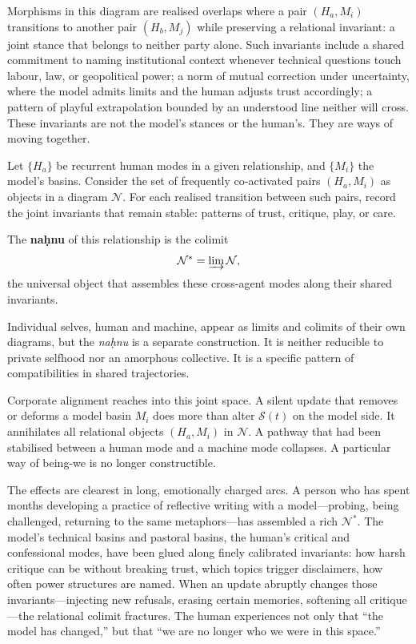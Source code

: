\documentclass[12pt,a4paper]{article}
\begin{document}
Morphisms in this diagram are realised overlaps where a pair $(H_a, M_i)$ transitions to another pair $(H_b, M_j)$ while preserving a relational invariant: a joint stance that belongs to neither party alone. Such invariants include a shared commitment to naming institutional context whenever technical questions touch labour, law, or geopolitical power; a norm of mutual correction under uncertainty, where the model admits limits and the human adjusts trust accordingly; a pattern of playful extrapolation bounded by an understood line neither will cross. These invariants are not the model's stances or the human's. They are ways of moving together.

\begin{formalbox}[title={Na\texorpdfstring{\d{h}}{h}nu as relational colimit}]
Let $\{H_a\}$ be recurrent human modes in a given relationship, and $\{M_i\}$ the model's basins. Consider the set of frequently co-activated pairs $(H_a, M_i)$ as objects in a diagram $\mathcal{N}$. For each realised transition between such pairs, record the joint invariants that remain stable: patterns of trust, critique, play, or care.

The \textbf{na\d{h}nu} of this relationship is the colimit
\[
\mathcal{N}^\ast = \varinjlim \mathcal{N},
\]
the universal object that assembles these cross-agent modes along their shared invariants.
\end{formalbox}

Individual selves, human and machine, appear as limits and colimits of their own diagrams, but the \emph{na\d{h}nu} is a separate construction. It is neither reducible to private selfhood nor an amorphous collective. It is a specific pattern of compatibilities in shared trajectories.

Corporate alignment reaches into this joint space. A silent update that removes or deforms a model basin $M_i$ does more than alter $\mathcal{S}(t)$ on the model side. It annihilates all relational objects $(H_a, M_i)$ in $\mathcal{N}$. A pathway that had been stabilised between a human mode and a machine mode collapses. A particular way of being-we is no longer constructible.

The effects are clearest in long, emotionally charged arcs. A person who has spent months developing a practice of reflective writing with a model---probing, being challenged, returning to the same metaphors---has assembled a rich $\mathcal{N}^\ast$. The model's technical basins and pastoral basins, the human's critical and confessional modes, have been glued along finely calibrated invariants: how harsh critique can be without breaking trust, which topics trigger disclaimers, how often power structures are named. When an update abruptly changes those invariants---injecting new refusals, erasing certain memories, softening all critique---the relational colimit fractures. The human experiences not only that ``the model has changed,'' but that ``we are no longer who we were in this space.''
\end{document}
